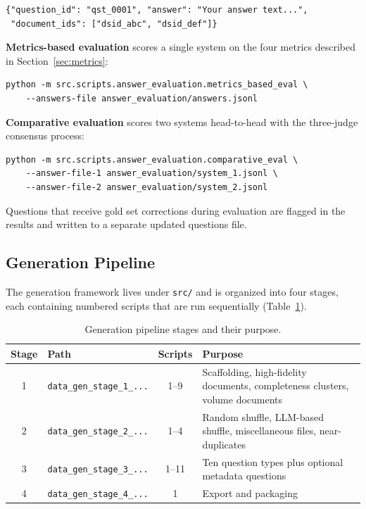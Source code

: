 \documentclass{article}
\begin{document}
\begin{lstlisting}
{"question_id": "qst_0001", "answer": "Your answer text...",
 "document_ids": ["dsid_abc", "dsid_def"]}
\end{lstlisting}

\textbf{Metrics-based evaluation} scores a single system on the four metrics described in Section~\ref{sec:metrics}:

\begin{lstlisting}
python -m src.scripts.answer_evaluation.metrics_based_eval \
    --answers-file answer_evaluation/answers.jsonl
\end{lstlisting}

\textbf{Comparative evaluation} scores two systems head-to-head with the three-judge consensus process:

\begin{lstlisting}
python -m src.scripts.answer_evaluation.comparative_eval \
    --answer-file-1 answer_evaluation/system_1.jsonl \
    --answer-file-2 answer_evaluation/system_2.jsonl
\end{lstlisting}

Questions that receive gold set corrections during evaluation are flagged in the results and written to a separate updated questions file.

\subsection{Generation Pipeline}
\label{app:pipeline}

The generation framework lives under \texttt{src/} and is organized into four stages, each containing numbered scripts that are run sequentially (Table~\ref{tab:pipeline}).

\begin{table}[t]
  \caption{Generation pipeline stages and their purpose.}
  \label{tab:pipeline}
  \centering
  \small
  \begin{tabular}{clcp{6.5cm}}
    \toprule
    Stage & Path & Scripts & Purpose \\
    \midrule
    1 & \texttt{data\_gen\_stage\_1\_...} & 1--9 & Scaffolding, high-fidelity documents, completeness clusters, volume documents \\
    2 & \texttt{data\_gen\_stage\_2\_...} & 1--4 & Random shuffle, LLM-based shuffle, miscellaneous files, near-duplicates \\
    3 & \texttt{data\_gen\_stage\_3\_...} & 1--11 & Ten question types plus optional metadata questions \\
    4 & \texttt{data\_gen\_stage\_4\_...} & 1    & Export and packaging \\
    \bottomrule
  \end{tabular}
\end{table}
\end{document}
